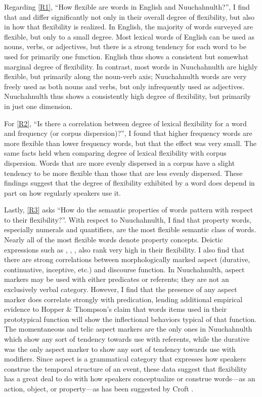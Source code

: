 Regarding \ref{R1}, \enquote{How flexible are words in English and Nuuchahnulth?}, I find that  and  differ significantly not only in their overall degree of flexibility, but also in how that flexibility is realized. In English, the majority of words surveyed are flexible, but only to a small degree. Most lexical words of English can be used as nouns, verbs, or adjectives, but there is a strong tendency for each word to be used for primarily one function. English thus shows a consistent but somewhat marginal degree of flexibility. In contrast, most words in Nuuchahnulth are highly flexible, but primarily along the noun-verb axis; Nuuchahnulth words are very freely used as both nouns and verbs, but only infrequently used as adjectives. Nuuchahnulth thus shows a consistently high degree of flexibility, but primarily in just one dimension.

For \ref{R2}, \enquote{Is there a correlation between degree of lexical flexibility for a word and frequency (or corpus dispersion)?}, I found that higher frequency words are more flexible than lower frequency words, but that the effect was very small. The same facts held when comparing degree of lexical flexibility with corpus dispersion. Words that are more evenly dispersed in a corpus have a slight tendency to be more flexible than those that are less evenly dispersed. These findings suggest that the degree of flexibility exhibited by a word does depend in part on how regularly speakers use it.

Lastly, \ref{R3} asks \enquote{How do the semantic properties of words pattern with respect to their flexibility?}. With respect to Nuuchahnulth, I find that property words, especially numerals and quantifiers, are the most flexible semantic class of words. Nearly all of the most flexible words denote property concepts. Deictic expressions such as , , ,  also rank very high in their flexibility. I also find that there are strong correlations between morphologically marked aspect (durative, continuative, inceptive, etc.) and discourse function. In Nuuchahnulth, aspect markers may be used with either predicates or referents; they are not an exclusively verbal category. However, I find that the presence of any aspect marker does correlate strongly with predication, lending additional empirical evidence to Hopper \& Thompson's \parencite*{HopperThompson1984} claim that words items used in their prototypical function will show the inflectional behaviors typical of that function. The momentaneous and telic aspect markers are the only ones in Nuuchahnulth which show any sort of tendency towards use with referents, while the durative was the only aspect marker to show any sort of tendency towards use with modifiers. Since aspect is a grammatical category that expresses how speakers construe the temporal structure of an event, these data suggest that flexibility has a great deal to do with how speakers conceptualize or construe words—as an action, object, or property—as has been suggested by Croft \parencites*[99]{Croft1991}[104]{Croft2001}.

